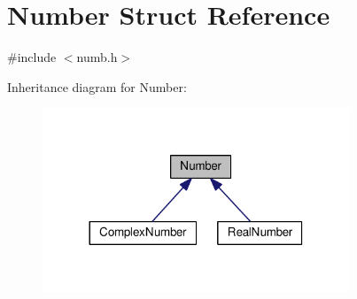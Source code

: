 \hypertarget{structNumber}{}\section{Number Struct Reference}
\label{structNumber}


{\ttfamily \#include $<$numb.\+h$>$}



Inheritance diagram for Number\+:
\nopagebreak
\begin{figure}[H]
\begin{center}
\leavevmode
\includegraphics[width=260pt]{d0/db6/structNumber__inherit__graph}
\end{center}
\end{figure}
